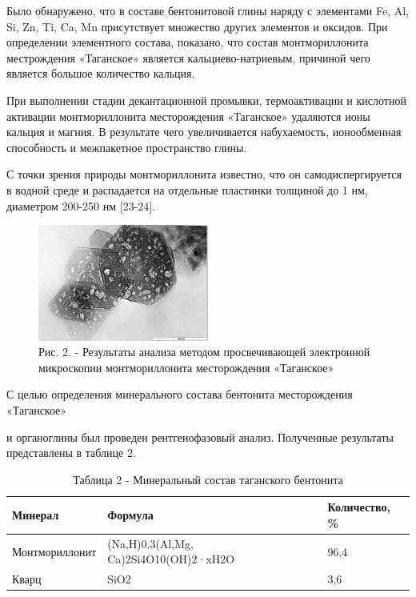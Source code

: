 \begin{multicols}{2}
Было обнаружено, что в составе бентонитовой глины наряду с элементами
Fe, Al, Si, Zn, Ti, Ca, Mn присутствует множество других элементов и
оксидов. При определении элементного состава, показано, что состав
монтмориллонита местрождения «Таганское» является кальциево-натриевым,
причиной чего является большое количество кальция.

При выполнении стадии декантационной промывки, термоактивации и
кислотной активации монтмориллонита месторождения «Таганское» удаляются
ионы кальция и магния. В результате чего увеличивается набухаемость,
ионообменная способность и межпакетное пространство глины.

С точки зрения природы монтмориллонита известно, что он
самодиспергируется в водной среде и распадается на отдельные пластинки
толщиной до 1 нм, диаметром 200-250 нм {[}23-24{]}.
\end{multicols}

\begin{figure}[H]
	\centering
	\includegraphics[width=0.5\textwidth]{assets/1015}
	\caption*{Рис. 2. - Результаты анализа методом просвечивающей электронной микроскопии монтмориллонита месторождения «Таганское»}
\end{figure}

С целью определения минерального состава бентонита месторождения
«Таганское»

и органоглины был проведен рентгенофазовый анализ. Полученные результаты
представлены в таблице 2.

\begin{table}[H]
\caption*{Таблица 2 - Минеральный состав таганского бентонита}
\centering
\begin{tabular}{|l|l|l|}
\hline
\textbf{Минерал} & \textbf{Формула} & \textbf{Количество, \%} \\ \hline
Монтмориллонит & (Na,Н)0.3(Al,Mg, Ca)2Si4O10(OH)2·xH2O & 96,4 \\ \hline
Кварц & SiO2 & 3,6 \\ \hline
\end{tabular}
\end{table}

